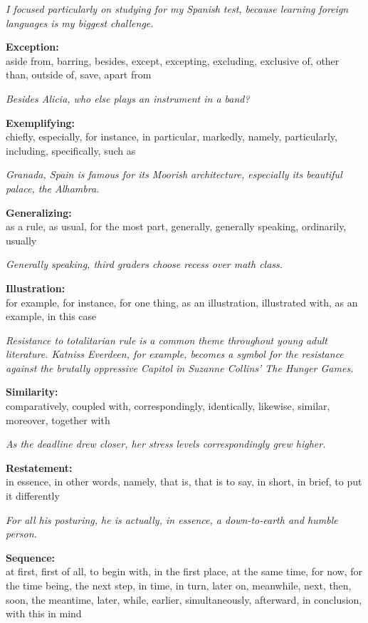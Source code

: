 \documentclass[12pt]{book}
\begin{document}
\bigskip
\textit{I focused particularly on studying for my Spanish test, because learning foreign languages is my biggest challenge. }

\bigskip
\textbf{Exception:}\\
aside from, barring, besides, except, excepting, excluding, exclusive of, other than, outside of, save, apart from

\bigskip
\textit{Besides Alicia, who else plays an instrument in a band?}

\bigskip
\textbf{Exemplifying:}\\
chiefly, especially, for instance, in particular, markedly, namely, particularly, including, specifically, such as

\bigskip
\textit{Granada, Spain is famous for its Moorish architecture, especially its beautiful palace, the Alhambra.}

\bigskip
\textbf{Generalizing:}\\
as a rule, as usual, for the most part, generally, generally speaking, ordinarily, usually

\bigskip
\textit{Generally speaking, third graders choose recess over math class.}

\bigskip
\textbf{Illustration:}\\
for example, for instance, for one thing, as an illustration, illustrated with, as an example, in this case


\bigskip
\textit{Resistance to totalitarian rule is a common theme throughout young adult literature.  Katniss Everdeen, for example, becomes a symbol for the resistance against the brutally oppressive Capitol in Suzanne Collins' The Hunger Games.}

\bigskip
\textbf{Similarity:}\\
comparatively, coupled with, correspondingly, identically, likewise, similar, moreover, together with

\bigskip
\textit{As the deadline drew closer, her stress levels correspondingly grew higher.}

\bigskip
\textbf{Restatement:}\\
in essence, in other words, namely, that is, that is to say, in short, in brief, to put it differently

\bigskip
\textit{For all his posturing, he is actually, in essence, a down-to-earth and humble person.}

\bigskip
\textbf{Sequence:}\\
at first, first of all, to begin with, in the first place, at the same time, for now, for the time being, the next step, in time, in turn, later on, meanwhile, next, then, soon, the meantime, later, while, earlier, simultaneously, afterward, in conclusion, with this in mind
\end{document}
